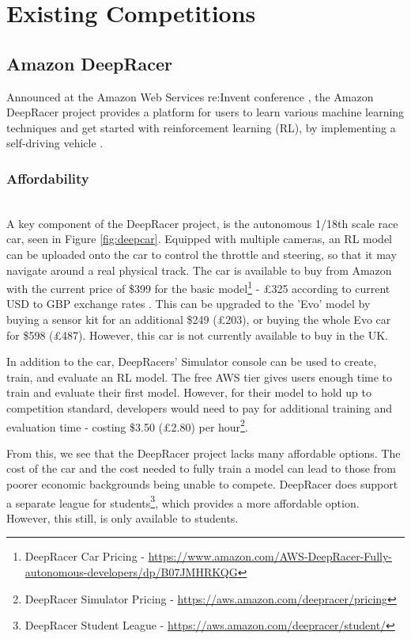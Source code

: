 \documentclass{l4proj}
\begin{document}
\section{Existing Competitions}
\subsection{Amazon DeepRacer}\label{sec:deepracer}
Announced at the Amazon Web Services re:Invent conference \citep{DeepracerAnnounced}, the Amazon DeepRacer project provides a platform for users to learn various machine learning techniques and get started with reinforcement learning (RL), by implementing a self-driving vehicle \citep{balaji2020deepracer}.

\subsubsection{Affordability} \hfill \\
A key component of the DeepRacer project, is the autonomous 1/18th scale race car, seen in Figure \ref{fig:deepcar}. Equipped with multiple cameras, an RL model can be uploaded onto the car to control the throttle and steering, so that it may navigate around a real physical track. The car is available to buy from Amazon with the current price of \$399 for the basic model\footnote{DeepRacer Car Pricing - \url{https://www.amazon.com/AWS-DeepRacer-Fully-autonomous-developers/dp/B07JMHRKQG}} - £325 according to current USD to GBP exchange rates \citep{exchangerates}. This can be upgraded to the 'Evo' model by buying a sensor kit for an additional \$249 (£203), or buying the whole Evo car for \$598 (£487). However, this car is not currently available to buy in the UK.

In addition to the car, DeepRacers' Simulator console can be used to create, train, and evaluate an RL model. The free AWS tier gives users enough time to train and evaluate their first model. However, for their model to hold up to competition standard, developers would need to pay for additional training and evaluation time - costing \$3.50 (£2.80) per hour\footnote{DeepRacer Simulator Pricing - \url{https://aws.amazon.com/deepracer/pricing}}.

From this, we see that the DeepRacer project lacks many affordable options. The cost of the car and the cost needed to fully train a model can lead to those from poorer economic backgrounds being unable to compete. DeepRacer does support a separate league for students\footnote{DeepRacer Student League - \url{https://aws.amazon.com/deepracer/student/}}, which provides a more affordable option. However, this still, is only available to students.
\end{document}
